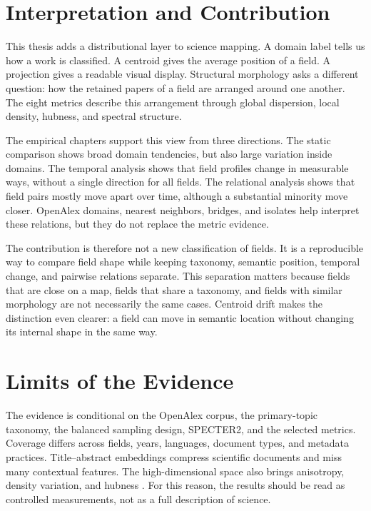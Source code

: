 
\section{Interpretation and Contribution}

This thesis adds a distributional layer to science mapping. A domain label tells us how a work is classified. A centroid gives the average position of a field. A projection gives a readable visual display. Structural morphology asks a different question: how the retained papers of a field are arranged around one another. The eight metrics describe this arrangement through global dispersion, local density, hubness, and spectral structure.

The empirical chapters support this view from three directions. The static comparison shows broad domain tendencies, but also large variation inside domains. The temporal analysis shows that field profiles change in measurable ways, without a single direction for all fields. The relational analysis shows that field pairs mostly move apart over time, although a substantial minority move closer. OpenAlex domains, nearest neighbors, bridges, and isolates help interpret these relations, but they do not replace the metric evidence.

The contribution is therefore not a new classification of fields. It is a reproducible way to compare field shape while keeping taxonomy, semantic position, temporal change, and pairwise relations separate. This separation matters because fields that are close on a map, fields that share a taxonomy, and fields with similar morphology are not necessarily the same cases. Centroid drift makes the distinction even clearer: a field can move in semantic location without changing its internal shape in the same way.

\section{Limits of the Evidence}

The evidence is conditional on the OpenAlex corpus, the primary-topic taxonomy, the balanced sampling design, SPECTER2, and the selected metrics. Coverage differs across fields, years, languages, document types, and metadata practices. Title--abstract embeddings compress scientific documents and miss many contextual features. The high-dimensional space also brings anisotropy, density variation, and hubness \parencite{aggarwal2001surprising,radovanovic2010hubness}. For this reason, the results should be read as controlled measurements, not as a full description of science.

